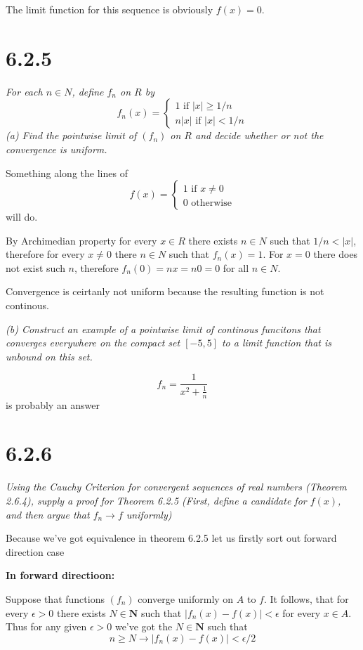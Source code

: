 \documentclass[11pt,oneside,titlepage]{book}
\begin{document}
The limit function for this sequence is obviously $f(x) = 0$.

\section*{6.2.5}
\textit{For each $n \in N$, define $f_n$ on $R$ by}
$$f_n(x) =
\begin{cases}
  1 \text{ if } |x| \geq 1/n \\
  n|x| \text{ if } |x| < 1/n
\end{cases}
$$
\textit{(a) Find the pointwise limit of $(f_n)$ on $R$ and
  decide whether or not the convergence is uniform. }

Something along the lines of 
$$f(x) =
\begin{cases}
  1 \text{ if } x \neq 0 \\
  0 \text{ otherwise}
\end{cases}
$$
will do.

By Archimedian property for every $x \in R$ there exists $n \in N$ such that
$1/n < |x|$, therefore for every $x \neq 0$ there $n \in N$ such that
$f_n(x) = 1$. For $x = 0$ there does not exist such $n$, therefore $f_n(0) =
nx = n0 = 0$ for all $n \in N$.

Convergence is ceirtanly not uniform because the resulting function is not
continous.

\textit{(b) Construct an example of a pointwise limit of continous funcitons
  that converges everywhere on the compact set $[-5, 5]$ to a limit function
  that is unbound on this set.}

$$f_n = \frac{1}{x^2 + \frac{1}{n}}$$
is probably an answer

\section*{6.2.6}
\textit{Using the Cauchy Criterion for convergent sequences of real numbers
  (Theorem 2.6.4), supply a proof for Theorem 6.2.5 (First, define a candidate
  for $f(x)$, and then argue that $f_n \to f$ uniformly)}

Because we've got equivalence in theorem 6.2.5 let us firstly sort
out forward direction case

\textbf{In forward directioon:}

Suppose that functions $(f_n)$ converge uniformly on $A$ to $f$. It follows,
that for every $\epsilon > 0$ there exists $N \in \textbf{N}$ such that
$|f_n(x) - f(x)| < \epsilon$ for every $x \in A$. Thus for any given
$\epsilon > 0$ we've got the $N \in \textbf{N}$ such that
$$n \geq N \to |f_n(x) - f(x)| < \epsilon / 2$$
\end{document}
